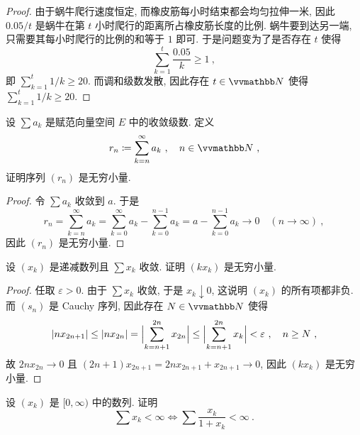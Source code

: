 \begin{proof}
    由于蜗牛爬行速度恒定, 而橡皮筋每小时结束都会均匀拉伸一米, 因此 \(0.05 / t\) 是蜗牛在第 \(t\) 小时爬行的距离所占橡皮筋长度的比例. 蜗牛要到达另一端, 只需要其每小时爬行的比例的和等于 \(1\) 即可. 于是问题变为了是否存在 \(t\) 使得
    \[
        \sum_{k = 1}^t \frac{0.05}{k} \geq 1\ ,
    \]
    即 \(\sum_{k = 1}^t 1 / k \geq 20\). 而调和级数发散, 因此存在 \(t \in \N\) 使得 \(\sum_{k = 1}^t 1 / k \geq 20\).
\end{proof}

\begin{exercise}\label{ex:rear-of-convergent-series-converges-to-0}
    设 \(\sum a_k\) 是赋范向量空间 \(E\) 中的收敛级数. 定义
    \[
        r_n \coloneqq \sum_{k = n}^\infty a_k\ ,\quad n \in \N\ ,
    \]
    证明序列 \((r_n)\) 是无穷小量.
\end{exercise}

\begin{proof}
    令 \(\sum a_k\) 收敛到 \(a\). 于是
    \[
        r_n = \sum_{k = n}^\infty a_k = \sum_{k = 0}^\infty a_k - \sum_{k = 0}^{n - 1} a_k = a - \sum_{k = 0}^{n - 1} a_k \to 0\quad (n \to \infty)\ ,
    \]
    因此 \((r_n)\) 是无穷小量.
\end{proof}

\begin{exercise}
    设 \((x_k)\) 是递减数列且 \(\sum x_k\) 收敛. 证明 \((k x_k)\) 是无穷小量.
\end{exercise}

\begin{proof}
    任取 \(\varepsilon > 0\). 由于 \(\sum x_k\) 收敛, 于是 \(x_k \downarrow 0\), 这说明 \((x_k)\) 的所有项都非负. 而 \((s_n)\) 是 Cauchy 序列, 因此存在 \(N \in \N\) 使得
    \[
        |n x_{2 n + 1}| \leq |n x_{2 n}| = \Bigl|\sum_{k = n + 1}^{2 n} x_{2 n}\Bigr| \leq \Bigl|\sum_{k = n + 1}^{2 n} x_k\Bigr| < \varepsilon\ ,\quad n \geq N\ ,
    \]
    故 \(2 n x_{2 n} \to 0\) 且 \((2 n + 1) x_{2 n + 1} = 2 n x_{2 n + 1} + x_{2 n + 1} \to 0\), 因此 \((k x_k)\) 是无穷小量.
\end{proof}

\begin{exercise}
    设 \((x_k)\) 是 \([0, \infty)\) 中的数列. 证明
    \[
        \sum x_k < \infty \iff \sum \frac{x_k}{1 + x_k} < \infty\ .
    \]
\end{exercise}

